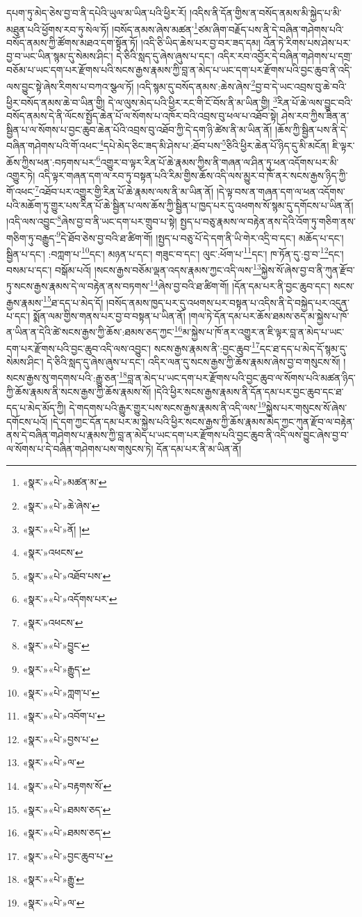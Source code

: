 དཔག་ཏུ་མེད་ཅེས་བྱ་བ་ནི་དཔེའི་ཡུལ་མ་ཡིན་པའི་ཕྱིར་རོ། །འདིས་ནི་དོན་གྱིས་ན་བསོད་ནམས་མི་སྐྱེད་པ་མི་མཐུན་པའི་ཕྱོགས་རབ་ཏུ་སེལ་ཏོ། །བསོད་ནམས་ཞེས་མཚན་\footnote{«སྣར་»«པེ་»མཚན་མ་}ཙམ་ཞིག་བརྗོད་པས་ནི་དེ་བཞིན་གཤེགས་པའི་བསོད་ནམས་ཀྱི་ཚོགས་མཐའ་དག་སྟོན་ཏོ། །འདི་ཅི་ཡིད་ཆེས་པར་བྱ་བར་ཟད་དམ། འོན་ཏེ་རིགས་པས་ཤེས་པར་བྱ་བ་ཡང་ཡིན་སྙམ་དུ་སེམས་ཤིང་། དེ་ཅིའི་སླད་དུ་ཞེས་ཞུས་པ་དང་། འདིར་རབ་འབྱོར་དེ་བཞིན་གཤེགས་པ་དགྲ་བཅོམ་པ་ཡང་དག་པར་རྫོགས་པའི་སངས་རྒྱས་རྣམས་ཀྱི་བླ་ན་མེད་པ་ཡང་དག་པར་རྫོགས་པའི་བྱང་ཆུབ་ནི་འདི་ལས་བྱུང་སྟེ་ཞེས་རིགས་པ་བཀའ་སྩལ་ཏོ། །འདི་སྙམ་དུ་བསོད་ནམས་:ཆེས་ཞེས་\footnote{«སྣར་»«པེ་»ཆེ་ཞེས་}བྱ་བ་དེ་ཡང་འབྲས་བུ་ཆེ་བའི་ཕྱིར་བསོད་ནམས་ཆེ་བ་ཡིན་གྱི། དེ་ལ་ལུས་མེད་པའི་ཕྱིར་རང་གི་ངོ་བོས་ནི་མ་ཡིན་གྱི། \footnote{«སྣར་»«པེ་»ནོ། ། }རིན་པོ་ཆེ་ལས་བྱུང་བའི་བསོད་ནམས་དེ་ནི་ལོངས་སྤྱོད་ཆེན་པོ་ལ་སོགས་པ་འཁོར་བའི་འབྲས་བུ་ཕལ་པ་འཐོབ་སྟེ། ཤེས་རབ་ཀྱིས་ཟིན་ན་སྦྱིན་པ་ལ་སོགས་པ་བྱང་ཆུབ་ཆེན་པོའི་འབྲས་བུ་འཐོབ་ཀྱི་དེ་དག་ཉི་ཚེས་ནི་མ་ཡིན་ནོ། །ཆོས་ཀྱི་སྦྱིན་པས་ནི་དེ་བཞིན་གཤེགས་པའི་གོ་འཕང་\footnote{«སྣར་»འཕངས་}དཔེ་མེད་ཅིང་ཟད་མི་ཤེས་པ་:ཐོབ་པས་\footnote{«སྣར་»«པེ་»འཐོབ་པས་}ཅིའི་ཕྱིར་ཆེན་པོ་ཉིད་དུ་མི་མངོན། ཇི་ལྟར་ཆོས་ཀྱིས་ཕན་:བཏགས་པར་\footnote{«སྣར་»«པེ་»འདོགས་པར་}འགྱུར་བ་ལྟར་རིན་པོ་ཆེ་རྣམས་ཀྱིས་ནི་གཞན་ལ་ཤིན་ཏུ་ཕན་འདོགས་པར་མི་འགྱུར་ཏེ། འདི་ལྟར་གཞན་དག་ལ་རབ་ཏུ་བསྟན་པའི་རིམ་གྱིས་ཆོས་འདི་ལས་མྱུར་བ་ཁོ་ནར་སངས་རྒྱས་ཉིད་ཀྱི་གོ་འཕང་\footnote{«སྣར་»འཕངས་}འཐོབ་པར་འགྱུར་གྱི་རིན་པོ་ཆེ་རྣམས་ལས་ནི་མ་ཡིན་ནོ། །དེ་ལྟ་བས་ན་གཞན་དག་ལ་ཕན་འདོགས་པའི་མཆོག་ཏུ་གྱུར་པས་རིན་པོ་ཆེ་སྦྱིན་པ་ལས་ཆོས་ཀྱི་སྦྱིན་པ་ཁྱད་པར་དུ་འཕགས་སོ་སྙམ་དུ་དགོངས་པ་ཡིན་ནོ། །འདི་ལས་འབྱུང་\footnote{«སྣར་»«པེ་»བྱུང་}ཞེས་བྱ་བ་ནི་ཡང་དག་པར་གྲུབ་པ་སྟེ། སྤྱད་པ་བཅུ་རྣམས་ལ་བརྟེན་ནས་དེའི་འོག་ཏུ་གཅིག་ནས་གཅིག་ཏུ་བརྒྱུད་\footnote{«སྣར་»«པེ་»རྒྱུད་}དེ་ཐོབ་ཅེས་བྱ་བའི་ཐ་ཚིག་གོ། །སྤྱད་པ་བཅུ་པོ་དེ་དག་ནི་ཡི་གེར་འདྲི་བ་དང་། མཆོད་པ་དང་། སྦྱིན་པ་དང་། :བཀླག་པ་\footnote{«སྣར་»«པེ་»ཀླག་པ་}དང་། མཉན་པ་དང་། གཟུང་བ་དང་། ལུང་:ཕོག་པ་\footnote{«སྣར་»«པེ་»འབོག་པ་}དང་། ཁ་ཏོན་དུ་:བྱ་བ་\footnote{«སྣར་»«པེ་»བྱས་པ་}དང་། བསམ་པ་དང་། བསྒོམ་པའོ། །སངས་རྒྱས་བཅོམ་ལྡན་འདས་རྣམས་ཀྱང་འདི་ལས་\footnote{«སྣར་»«པེ་»ལ་}སྐྱེས་སོ་ཞེས་བྱ་བ་ནི་ཀུན་རྫོབ་ཏུ་སངས་རྒྱས་རྣམས་དེ་ལ་བརྟེན་ནས་བཏགས་\footnote{«སྣར་»«པེ་»བརྟགས་སོ་}ཞེས་བྱ་བའི་ཐ་ཚིག་གོ། །དོན་དམ་པར་ནི་བྱང་ཆུབ་དང་། སངས་རྒྱས་རྣམས་\footnote{«སྣར་»«པེ་»ཐམས་ཅད་}ཐ་དད་པ་མེད་དོ། །བསོད་ནམས་ཁྱད་པར་དུ་འཕགས་པར་བསྟན་པ་འདིས་ནི་དེ་བསྐྱེད་པར་འདུན་པ་དང་། སྨོན་ལམ་གྱིས་གནས་པར་བྱ་བ་བསྟན་པ་ཡིན་ནོ། །གལ་ཏེ་དོན་དམ་པར་ཆོས་ཐམས་ཅད་མ་སྐྱེས་པ་ཁོ་ན་ཡིན་ན་དེའི་ཚེ་སངས་རྒྱས་ཀྱི་ཆོས་:ཐམས་ཅད་ཀྱང་\footnote{«སྣར་»«པེ་»ཐམས་ཅད་}མ་སྐྱེས་པ་ཁོ་ནར་འགྱུར་ན་ཇི་ལྟར་བླ་ན་མེད་པ་ཡང་དག་པར་རྫོགས་པའི་བྱང་ཆུབ་འདི་ལས་འབྱུང་། སངས་རྒྱས་རྣམས་ནི་:བྱང་ཆུབ་\footnote{«སྣར་»«པེ་»བྱང་ཆུབ་པ་}དང་ཐ་དད་པ་མེད་དོ་སྙམ་དུ་སེམས་ཤིང་། དེ་ཅིའི་སླད་དུ་ཞེས་ཞུས་པ་དང་། འདིར་ལན་དུ་སངས་རྒྱས་ཀྱི་ཆོས་རྣམས་ཞེས་བྱ་བ་གསུངས་སོ། །སངས་རྒྱས་སུ་གདགས་པའི་:རྒྱུ་ཅན་\footnote{«སྣར་»«པེ་»རྒྱུ་}བླ་ན་མེད་པ་ཡང་དག་པར་རྫོགས་པའི་བྱང་ཆུབ་ལ་སོགས་པའི་མཚན་ཉིད་ཀྱི་ཆོས་རྣམས་ནི་སངས་རྒྱས་ཀྱི་ཆོས་རྣམས་སོ། །དེའི་ཕྱིར་སངས་རྒྱས་རྣམས་ནི་དོན་དམ་པར་བྱང་ཆུབ་དང་ཐ་དད་པ་མེད་མོད་ཀྱི། དེ་གདགས་པའི་རྒྱུར་གྱུར་པས་སངས་རྒྱས་རྣམས་ནི་འདི་ལས་\footnote{«སྣར་»«པེ་»ལ་}སྐྱེས་པར་གསུངས་སོ་ཞེས་དགོངས་པའོ། །དེ་དག་ཀྱང་དོན་དམ་པར་མ་སྐྱེས་པའི་ཕྱིར་སངས་རྒྱས་ཀྱི་ཆོས་རྣམས་མེད་ཀྱང་ཀུན་རྫོབ་ལ་བརྟེན་ནས་དེ་བཞིན་གཤེགས་པ་རྣམས་ཀྱི་བླ་ན་མེད་པ་ཡང་དག་པར་རྫོགས་པའི་བྱང་ཆུབ་ནི་འདི་ལས་བྱུང་ཞེས་བྱ་བ་ལ་སོགས་པ་དེ་བཞིན་གཤེགས་པས་གསུངས་ཏེ། དོན་དམ་པར་ནི་མ་ཡིན་ནོ། 